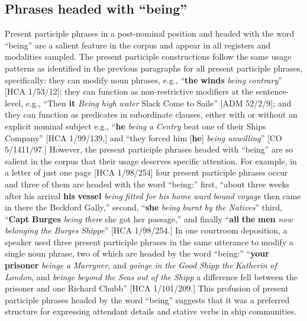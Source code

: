 \subsection{\textbf{Phrases} \textbf{headed} \textbf{with} \textbf{“being”}}%

  Present participle phrases in a post-nominal position and headed with the word “being” are a salient feature in the corpus and appear in all registers and modalities sampled. The present participle constructions follow the same usage patterns as identified in the previous paragraphs for all present participle phrases, specifically: they can modify noun phrases, e.g., “\textbf{the} \textbf{winds} \textit{being} \textit{contrary}” [HCA 1/53/12]; they can function as non-restrictive modifiers at the sentence-level, e.g., “Then \textbf{it} \textit{Being} \textit{high} \textit{water} Slack Come to Saile” [ADM 52/2/9]; and they can function as predicates in subordinate clauses, either with or without an explicit nominal subject e.g., “\textbf{he} \textit{being} \textit{a} \textit{Centry} beat one of their Ships Company” [HCA 1/99/139,] and “they forced him [\textbf{he}] \textit{being} \textit{unwilling}” [CO 5/1411/97.] However, the present participle phrases headed with “being” are so salient in the corpus that their usage deserves specific attention. For example, in a letter of just one page [HCA 1/98/254] four present participle phrases occur and three of them are headed with the word “being:” first, “about three weeks after his arrival \textbf{his} \textbf{vessel} \textit{being} \textit{fitted} \textit{for} \textit{his} \textit{home} \textit{ward} \textit{bound} \textit{voyage} then came in there the Beckford Gally,” second, “\textbf{she} \textit{being} \textit{burnt} \textit{by} \textit{the} \textit{Natives}” third, “\textbf{Capt} \textbf{Burges} \textit{being} \textit{there} she got her passage,” and finally “\textbf{all} \textbf{the} \textbf{men} \textit{now} \textit{belonging} \textit{the} \textit{Burges} \textit{Shippe}” [HCA 1/98/254.] In one courtroom deposition, a speaker used three present participle phrases in the same utterance to modify a single noun phrase, two of which are headed by the word “being:” “\textbf{your} \textbf{prisoner} \textit{beinge} \textit{a} \textit{Marryner}, and \textit{goinge} \textit{in} \textit{the} \textit{Good} \textit{Shipp} \textit{the} \textit{Katherin} \textit{of} \textit{London}, and \textit{beinge} \textit{beyond} \textit{the} \textit{Seas} \textit{out} \textit{of} \textit{the} \textit{Shipp} a difference fell between the prisoner and one Richard Chubb” [HCA 1/101/209.] This profusion of present participle phrases headed by the word “being” suggests that it was a preferred structure for expressing attendant details and stative verbs in ship communities. 

